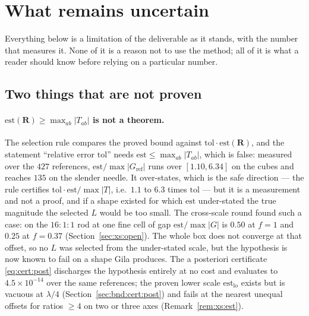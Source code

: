 \section{What remains uncertain}
\label{sec:unc}

Everything below is a limitation of the deliverable as it stands, with the number that
measures it. None of it is a reason not to use the method; all of it is what a reader should
know before relying on a particular number.

\subsection{Two things that are not proven}

\paragraph{$\mathrm{est}(\mathbf{R}) \ge \max_{ab}|T_{ab}|$ is not a theorem.} The selection
rule compares the proved bound against $\mathrm{tol}\cdot\mathrm{est}(\mathbf{R})$, and the
statement ``relative error $\mathrm{tol}$'' needs $\mathrm{est} \le \max_{ab}|T_{ab}|$,
which is false: measured over the $427$ references, $\mathrm{est}/\max|G_{\mathrm{ref}}|$
runs over $[1.10, 6.34]$ on the cubes and reaches $135$ on the slender needle. It
over-states, which is the safe direction --- the rule certifies
$\mathrm{tol}\cdot\mathrm{est}/\max|T|$, i.e.\ $1.1$ to $6.3$ times $\mathrm{tol}$ --- but
it is a measurement and not a proof, and if a shape existed for which $\mathrm{est}$
under-stated the true magnitude the selected $L$ would be too small. The cross-scale round
found such a case: on the $16{:}1{:}1$ rod at one fine cell of gap
$\mathrm{est}/\max|G|$ is $0.50$ at $f = 1$ and $0.25$ at $f = 0.37$
(Section~\ref{sec:xs:open}). The whole box does not converge at that offset, so no $L$ was
selected from the under-stated scale, but the hypothesis is now known to fail on a shape
Gila produces. The a posteriori
certificate \eqref{eq:cert:post} discharges the hypothesis entirely at no cost and evaluates
to $4.5\times10^{-14}$ over the same references; the proven lower scale
$\mathrm{est}_{\mathrm{lo}}$ exists but is vacuous at $\lambda/4$
(Section~\ref{sec:bnd:cert:post}) and fails at the nearest unequal offsets for ratios
$\ge4$ on two or three axes (Remark~\ref{rem:xs:est}).


